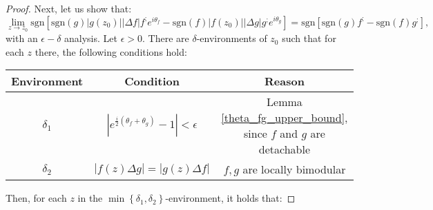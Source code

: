 \documentclass[11pt]{book}
\begin{document}
\begin{proof}
Next, let us show that:
$$\underset{z\to z_{0}}{\lim}\text{sgn}\left[\text{sgn}\left(g\right)\left|g\left(z_{0}\right)\right|\left|\Delta f\right|f^{;}e^{i\theta_{f}}-\text{sgn}\left(f\right)\left|f\left(z_{0}\right)\right|\left|\Delta g\right|g^{;}e^{i\theta_{g}}\right]=\text{sgn}\left[\text{sgn}\left(g\right)f^{;}-\text{sgn}\left(f\right)g^{;}\right],$$
with an $\epsilon-\delta$ analysis. Let $\epsilon>0.$ There are $\delta$-environments of $z_{0}$ such that for each $z$ there, the following conditions hold:

\begin{table}[H]
\centering
        \begin{tabular}{ccc}
        \toprule
        \textbf{Environment} & \textbf{Condition} & \textbf{Reason} \\
        \midrule
        $\delta_1$ & $\left|e^{\frac{i}{2}\left(\theta_{f}+\theta_{g}\right)}-1\right|<\epsilon$ & Lemma \ref{theta_fg_upper_bound}, since $f$ and $g$ are detachable \\
        $\delta_2$ & $\left|f\left(z\right)\Delta g\right|=\left|g\left(z\right)\Delta f\right|$ & $f,g$ are locally bimodular \\
        \bottomrule
        \end{tabular}
\end{table}

Then, for each $z$ in the $\min\left\{ \delta_{1},\delta_{2}\right\}$-environment, it holds that:


\end{proof}
\end{document}
